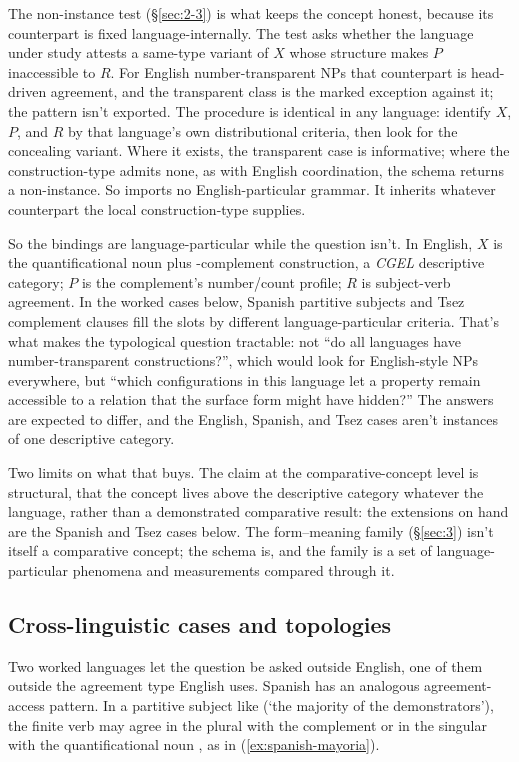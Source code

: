 The non-instance test (§\ref{sec:2-3}) is what keeps the concept honest, because its counterpart is fixed language-internally. The test asks whether the language under study attests a same-type variant of $X$ whose structure makes $P$ inaccessible to $R$. For English number-transparent NPs that counterpart is head-driven agreement, and the transparent class is the marked exception against it; the pattern isn't exported. The procedure is identical in any language: identify $X$, $P$, and $R$ by that language's own distributional criteria, then look for the concealing variant. Where it exists, the transparent case is informative; where the construction-type admits none, as with English coordination, the schema returns a non-instance. So  imports no English-particular grammar. It inherits whatever counterpart the local construction-type supplies.

So the bindings are language-particular while the question isn't. In English, $X$ is the quantificational noun plus -complement construction, a \textit{CGEL} descriptive category; $P$ is the complement's number/count profile; $R$ is subject-verb agreement. In the worked cases below, Spanish partitive subjects and Tsez complement clauses fill the slots by different language-particular criteria. That's what makes the typological question tractable: not \enquote{do all languages have number-transparent constructions?}, which would look for English-style NPs everywhere, but \enquote{which configurations in this language let a property remain accessible to a relation that the surface form might have hidden?} The answers are expected to differ, and the English, Spanish, and Tsez cases aren't instances of one descriptive category.

Two limits on what that buys. The claim at the comparative-concept level is structural, that the concept lives above the descriptive category whatever the language, rather than a demonstrated comparative result: the extensions on hand are the Spanish and Tsez cases below. The form--meaning family (§\ref{sec:3}) isn't itself a comparative concept; the schema is, and the family is a set of language-particular phenomena and measurements compared through it.

\subsection{Cross-linguistic cases and topologies}\label{sec:6-topologies}

Two worked languages let the question be asked outside English, one of them outside the agreement type English uses. Spanish has an analogous agreement-access pattern. In a partitive subject like  (`the majority of the demonstrators'), the finite verb may agree in the plural with the complement or in the singular with the quantificational noun , as in (\ref{ex:spanish-mayoria}).

